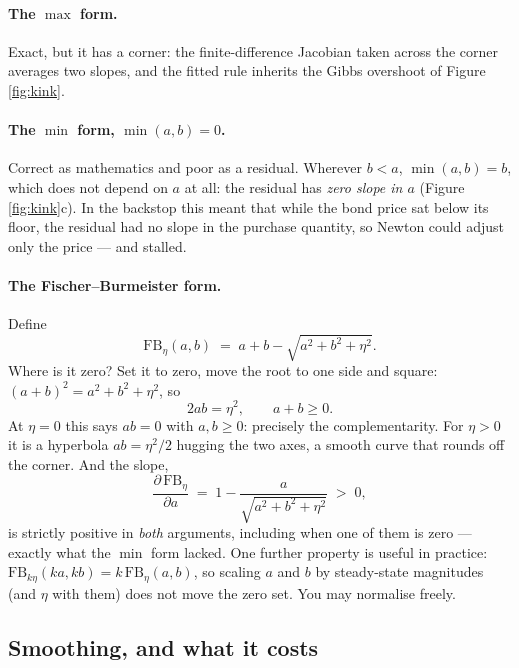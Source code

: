 \documentclass[10pt,a4paper]{article}
\theoremstyle{plain}
\theoremstyle{remark}
\begin{document}
\paragraph{The $\max$ form.} Exact, but it has a corner: the finite-difference Jacobian taken
across the corner averages two slopes, and the fitted rule inherits the Gibbs overshoot of
Figure \ref{fig:kink}.

\paragraph{The $\min$ form, $\min(a,b)=0$.} Correct as mathematics and poor as a residual. Wherever
$b<a$, $\min(a,b)=b$, which does not depend on $a$ at all: the residual has \emph{zero slope in
$a$} (Figure \ref{fig:kink}c). In the backstop this meant that while the bond price sat below its
floor, the residual had no slope in the purchase quantity, so Newton could adjust only the price ---
and stalled.

\paragraph{The Fischer--Burmeister form.} Define
\begin{equation}
  \mathrm{FB}_\eta(a,b) \;=\; a + b - \sqrt{a^2+b^2+\eta^2}.
  \label{eq:fb}
\end{equation}
Where is it zero? Set it to zero, move the root to one side and square:
$(a+b)^2 = a^2+b^2+\eta^2$, so
\begin{equation}
  2ab = \eta^2, \qquad a+b \ge 0.
  \label{eq:fbzero}
\end{equation}
At $\eta=0$ this says $ab=0$ with $a,b\ge0$: precisely the complementarity. For $\eta>0$ it is a
hyperbola $ab=\eta^2/2$ hugging the two axes, a smooth curve that rounds off the corner. And the
slope,
\begin{equation}
  \frac{\partial\,\mathrm{FB}_\eta}{\partial a} \;=\; 1-\frac{a}{\sqrt{a^2+b^2+\eta^2}} \;>\; 0,
\end{equation}
is strictly positive in \emph{both} arguments, including when one of them is zero --- exactly
what the $\min$ form lacked. One further property is useful in practice:
$\mathrm{FB}_{k\eta}(ka,kb) = k\,\mathrm{FB}_\eta(a,b)$, so scaling $a$ and $b$ by steady-state
magnitudes (and $\eta$ with them) does not move the zero set. You may normalise freely.

\subsection{Smoothing, and what it costs}
\label{sec:smoothing}
\end{document}
